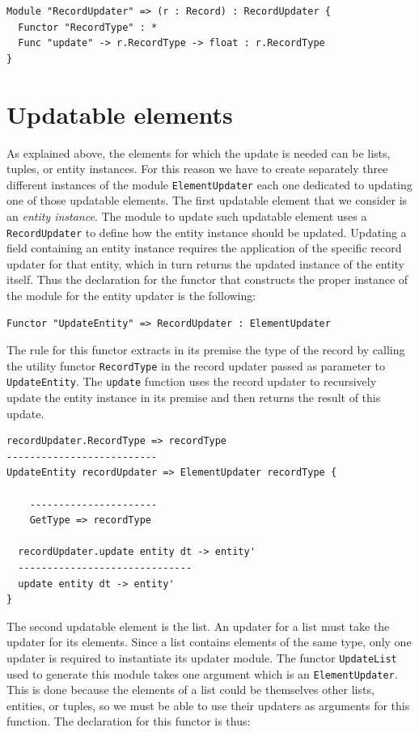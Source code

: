 \begin{lstlisting}
Module "RecordUpdater" => (r : Record) : RecordUpdater {
  Functor "RecordType" : *
  Func "update" -> r.RecordType -> float : r.RecordType
}
\end{lstlisting}

\section{Updatable elements}
\label{subsec:ch_networking_updatable_elements}
As explained above, the elements for which the update is needed can be lists, tuples, or entity instances. For this reason we have to create separately three different instances of the module \texttt{ElementUpdater} each one dedicated to updating one of those updatable elements. The first updatable element that we consider is an \textit{entity instance}. The module to update such updatable element uses a \texttt{RecordUpdater} to define how the entity instance should be updated. Updating a field containing an entity instance requires the application of the specific record updater for that entity, which in turn returns the updated instance of the entity itself. Thus the declaration for the functor that constructs the proper instance of the module for the entity updater is the following:

\begin{lstlisting}
Functor "UpdateEntity" => RecordUpdater : ElementUpdater
\end{lstlisting}

\noindent
The rule for this functor extracts in its premise the type of the record by calling the utility functor \texttt{RecordType} in the record updater passed as parameter to \texttt{UpdateEntity}. The \texttt{update} function uses the record updater to recursively update the entity instance in its premise and then returns the result of this update.

\begin{lstlisting}
recordUpdater.RecordType => recordType
--------------------------
UpdateEntity recordUpdater => ElementUpdater recordType {

	----------------------
	GetType => recordType
 
  recordUpdater.update entity dt -> entity'
  ------------------------------
  update entity dt -> entity'
}
\end{lstlisting}

\noindent
The second updatable element is the list. An updater for a list must take the updater for its elements. Since a list contains elements of the same type, only one updater is required to instantiate its updater module. The functor \texttt{UpdateList} used to generate this module takes one argument which is an \texttt{ElementUpdater}. This is done because the elements of a list could be themselves other lists, entities, or tuples, so we must be able to use their updaters as arguments for this function. The declaration for this functor is thus:

